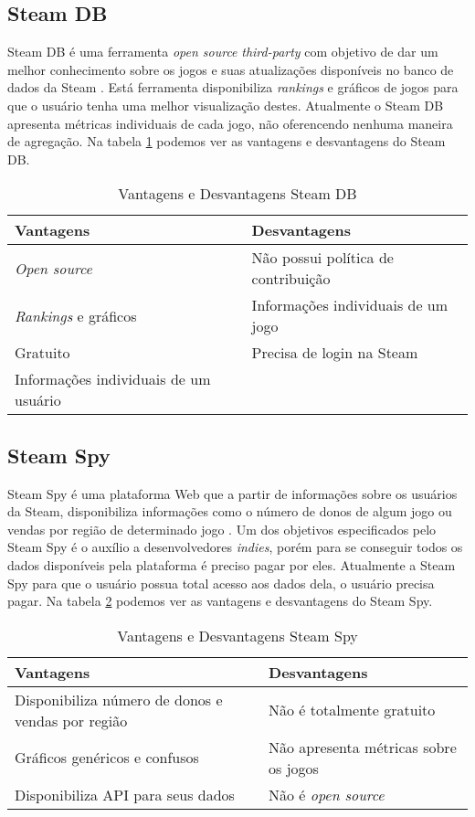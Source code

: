 \subsection{Steam DB}
Steam DB é uma ferramenta \textit{open source} \textit{third-party} com objetivo de dar um melhor conhecimento sobre os jogos e suas atualizações disponíveis no banco de dados da Steam \cite{steam_db}. Está ferramenta disponibiliza \textit{rankings} e gráficos de jogos para que o usuário tenha uma melhor visualização destes. Atualmente o Steam DB apresenta métricas individuais de cada jogo, não oferencendo nenhuma maneira de agregação. Na tabela \ref{table:steam_db} podemos ver as vantagens e desvantagens do Steam DB.
\begin{table}
\centering
\begin{tabular}{|p{7cm}|p{7cm}|}
\hline \textbf{Vantagens} & \textbf{Desvantagens} \\
\hline \textit{Open source} & Não possui política de contribuição \\
\hline \textit{Rankings} e gráficos & Informações individuais de um jogo \\
\hline Gratuito & Precisa de login na Steam \\
\hline Informações individuais de um usuário & \\
\hline
\end{tabular}
\caption{Vantagens e Desvantagens Steam DB}
\label{table:steam_db}
\end{table}
\subsection{Steam Spy}
Steam Spy é uma plataforma Web que a partir de informações sobre os usuários da Steam, disponibiliza informações como o número de donos de algum jogo ou vendas por região de determinado jogo \cite{steam_spy}. Um dos objetivos especificados pelo Steam Spy é o auxílio a desenvolvedores \textit{indies}, porém para se conseguir todos os dados disponíveis pela plataforma é preciso pagar por eles. Atualmente a Steam Spy para que o usuário possua total acesso aos dados dela, o usuário precisa pagar. Na tabela \ref{table:steam_spy} podemos ver as vantagens e desvantagens do Steam Spy.
\begin{table}
\centering
\begin{tabular}{|p{7cm}|p{7cm}|}
\hline \textbf{Vantagens} & \textbf{Desvantagens} \\
\hline Disponibiliza número de donos e vendas por região & Não é totalmente gratuito \\
\hline Gráficos genéricos e confusos & Não apresenta métricas sobre os jogos \\
\hline Disponibiliza API para seus dados & Não é \textit{open source} \\
\hline
\end{tabular}
\caption{Vantagens e Desvantagens Steam Spy}
\label{table:steam_spy}
\end{table}
